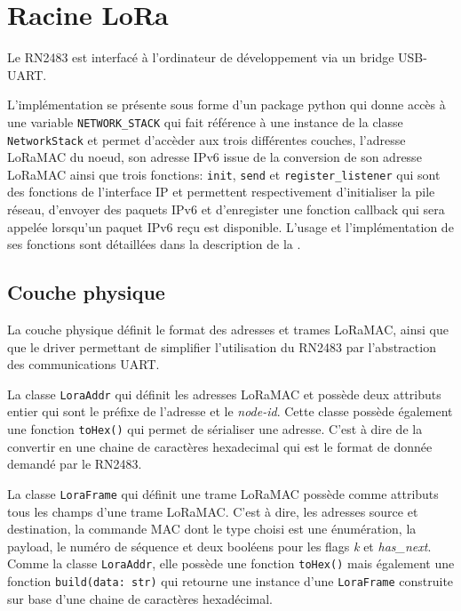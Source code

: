 \section{Racine LoRa}\label{sec:work-lora-root}
\renewcommand{\rightmark}{Trames LoRaMac}

    Le RN2483 est interfacé à l'ordinateur de développement via un bridge USB-UART.

    L'implémentation se présente sous forme d'un package python qui donne accès à une variable 
    \texttt{NETWORK\_STACK} qui fait référence à une instance de la classe \texttt{NetworkStack} et permet d'accèder aux trois 
    différentes couches, l'adresse LoRaMAC du noeud, son adresse IPv6 issue de la conversion de son 
    adresse LoRaMAC ainsi que trois fonctions: \texttt{init}, \texttt{send} et \texttt{register\_listener} qui sont des 
    fonctions de l'interface IP et permettent respectivement d'initialiser la pile réseau, 
    d'envoyer des paquets IPv6 et d'enregister une fonction callback qui sera appelée lorsqu'un 
    paquet IPv6 reçu est disponible. L'usage et l'implémentation de ses fonctions sont détaillées 
    dans la description de la .

\subsection*{Couche physique}
    La couche physique définit le format des adresses et trames LoRaMAC, ainsi que que le driver 
    permettant de simplifier l'utilisation du RN2483 par l'abstraction des communications UART.

    La classe \texttt{LoraAddr} qui définit les adresses LoRaMAC et possède deux attributs entier 
    qui sont le préfixe de l'adresse et le \textit{node-id}. Cette classe possède également une 
    fonction \texttt{toHex()} qui permet de sérialiser une adresse. C'est à dire de la convertir en 
    une chaine de caractères hexadecimal qui est le format de donnée demandé par le RN2483.

    La classe \texttt{LoraFrame} qui définit une trame LoRaMAC possède comme attributs tous les 
    champs d'une trame LoRaMAC. C'est à dire, les adresses source et destination, la commande MAC 
    dont le type choisi est une énumération, la payload, le numéro de séquence et deux booléens 
    pour les flags \textit{k} et \textit{has\_next}. Comme la classe \texttt{LoraAddr}, elle 
    possède une fonction \texttt{toHex()} mais également une fonction \texttt{build(data: str)} qui 
    retourne une instance d'une \texttt{LoraFrame} construite sur base d'une chaine de caractères hexadécimal.

